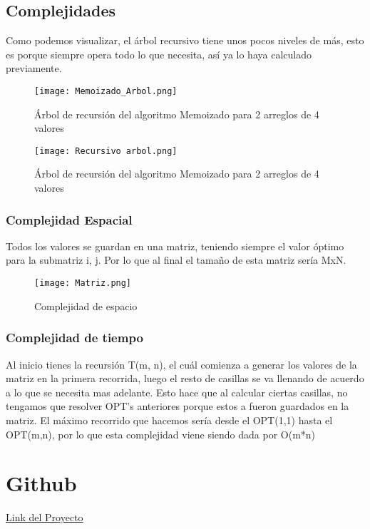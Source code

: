 \documentclass[12pt]{article}
\begin{document}
\subsection{Complejidades}
Como podemos visualizar, el árbol recursivo tiene unos pocos niveles de más, esto es porque siempre opera todo lo que necesita, así ya lo haya calculado previamente. 
 \begin{figure}[H]
		 \centering
		 \texttt{[image: Memoizado\_Arbol.png]}
		 \caption{Árbol de recursión del algoritmo Memoizado para 2 arreglos de 4 valores}
 \end{figure}
  \begin{figure}[H]
		 \centering
		 \texttt{[image: Recursivo arbol.png]}
		 \caption{Árbol de recursión del algoritmo Memoizado para 2 arreglos de 4 valores}
 \end{figure}
\subsubsection{Complejidad Espacial}
Todos los valores se guardan en una matriz, teniendo siempre el valor óptimo para la submatriz i, j.
Por lo que al final el tamaño de esta matriz sería MxN.
\begin{figure}[H]
		 \centering
		 \texttt{[image: Matriz.png]}
		 \caption{Complejidad de espacio}
\end{figure}
 
 
\subsubsection{Complejidad de tiempo}
Al inicio tienes la recursión T(m, n), el cuál comienza a generar los valores de la matriz en la primera recorrida, luego el resto de casillas se va llenando de acuerdo a lo que se necesita mas adelante. Esto hace que al calcular ciertas casillas, no tengamos que resolver OPT's anteriores porque estos a fueron guardados en la matriz. El máximo recorrido que hacemos sería desde el OPT(1,1) hasta el OPT(m,n), por lo que esta complejidad viene siendo dada por O(m*n)


\section{Github}
\href{https://github.com/LuchoPonceC/ADA-project}{Link del Proyecto}
\end{document}
